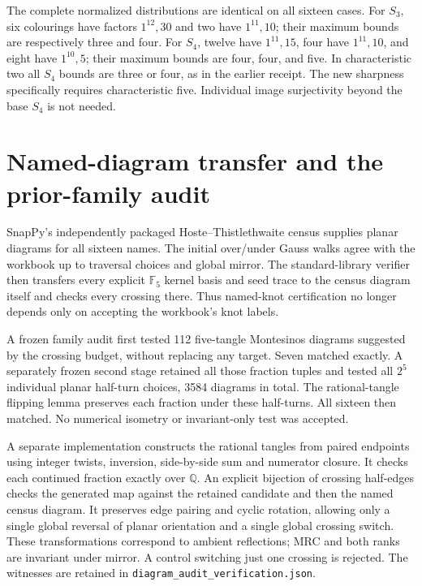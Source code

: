 \documentclass[11pt]{article}
\newcommand{\F}{\mathbb F}
\begin{document}
The complete normalized distributions are identical on all sixteen
cases. For $S_3$, six colourings have factors $1^{12},30$ and two have
$1^{11},10$; their maximum bounds are respectively three and four.
For $S_4$, twelve have $1^{11},15$, four have $1^{11},10$, and eight
have $1^{10},5$; their maximum bounds are four, four, and five.
In characteristic two all $S_4$ bounds are three or four, as in the
earlier receipt. The new sharpness specifically requires characteristic
five. Individual image surjectivity beyond the base $S_4$ is not needed.

\section{Named-diagram transfer and the prior-family audit}

SnapPy's independently packaged Hoste--Thistlethwaite census supplies
planar diagrams for all sixteen names. The initial over/under Gauss
walks agree with the workbook up to traversal choices and global mirror.
The standard-library verifier then transfers every explicit $\F_5$
kernel basis and seed trace to the census diagram itself and checks
every crossing there. Thus named-knot certification no longer depends
only on accepting the workbook's knot labels.

A frozen family audit first tested 112 five-tangle Montesinos diagrams
suggested by the crossing budget, without replacing any target. Seven
matched exactly. A separately frozen second stage retained all those
fraction tuples and tested all $2^5$ individual planar half-turn choices,
3584 diagrams in total. The rational-tangle flipping lemma
\cite[Lemma 2(iii)]{kl} preserves each fraction under these half-turns.
All sixteen then matched. No numerical isometry or invariant-only test
was accepted.

A separate implementation constructs the rational tangles from paired
endpoints using integer twists, inversion, side-by-side sum and numerator
closure. It checks each continued fraction exactly over $\mathbb Q$.
An explicit bijection of crossing half-edges checks the generated map
against the retained candidate and then the named census diagram.
It preserves edge pairing and cyclic rotation, allowing only a single
global reversal of planar orientation and a single global crossing
switch. These transformations correspond to ambient reflections; MRC
and both ranks are invariant under mirror. A control switching just one
crossing is rejected. The witnesses are retained in
\texttt{diagram\_audit\_verification.json}.
\end{document}
